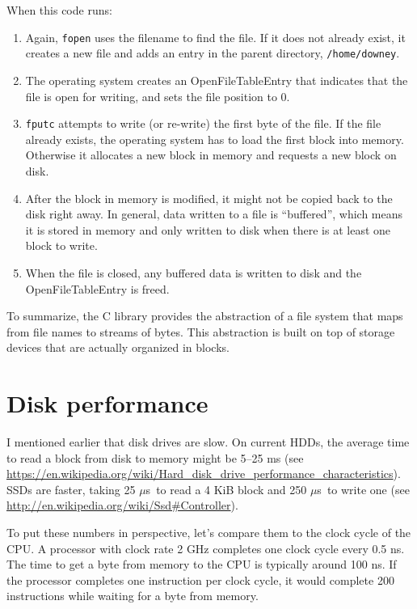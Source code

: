 \documentclass[12pt]{book}
\begin{document}
When this code runs:

\begin{enumerate}

\item Again, {\tt fopen} uses the filename to find the file.  If it
  does not already exist, it creates a new file and adds an entry in
  the parent directory, {\tt /home/downey}.

\item The operating system creates an OpenFileTableEntry that
  indicates that the file is open for writing, and sets the file
  position to 0.

\item {\tt fputc} attempts to write (or re-write) the first byte of
  the file.  If the file already exists, the operating system has to
  load the first block into memory.  Otherwise it allocates a new
  block in memory and requests a new block on disk.

\item After the block in memory is modified, it might not be copied
  back to the disk right away.  In general, data written to a file is
  ``buffered'', which means it is stored in memory and only written to
  disk when there is at least one block to write.

\item When the file is closed, any buffered data is written to disk
  and the OpenFileTableEntry is freed.

\end{enumerate}

To summarize, the C library provides the abstraction of a file
system that maps from file names to streams of bytes.  This abstraction
is built on top of storage devices that are actually organized
in blocks.


\section{Disk performance}

\newcommand{\mus}{$\mu$s~}

I mentioned earlier that disk drives are slow.  On current HDDs, the
average time to read a block from disk to memory might be 5--25 ms
(see \url{https://en.wikipedia.org/wiki/Hard_disk_drive_performance_characteristics}).
SSDs are faster, taking 25 \mus to read a 4 KiB block and 250 \mus to
write one (see \url{http://en.wikipedia.org/wiki/Ssd#Controller}).

To put these numbers in perspective, let's compare them to the clock
cycle of the CPU.  A processor with clock rate 2 GHz completes one
clock cycle every 0.5 ns.  The time to get a byte from memory to
the CPU is typically around 100 ns.  If the processor completes one
instruction per clock cycle, it would complete 200 instructions
while waiting for a byte from memory.
\end{document}
